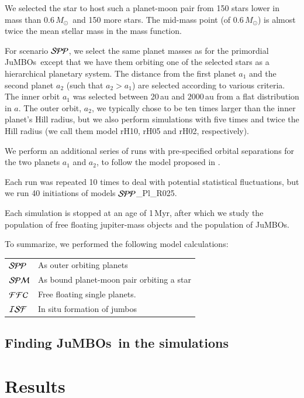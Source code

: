 \documentclass[aa]{lib/aa}
\newcommand{\MSun}{\mbox{${M}_\odot$}}
\newcommand{\jumbos}{\mbox{JuMBOs}}
\begin{document}
We selected the star to host such a planet-moon pair from 150 stars
lower in mass than 0.6\,\MSun\, and 150 more stars. The mid-mass point
(of 0.6\,\MSun) is almost twice the mean stellar mass in the mass
function.

For scenario ${\cal SPP}$, we select the same planet masses as for the
primordial \jumbos\, except that we have them orbiting one of the
selected stars as a hierarchical planetary system. The distance from
the first planet $a_1$ and the second planet $a_2$ (such that
$a_2>a_1$) are selected according to various criteria.  The inner
orbit $a_1$ was selected between 20\,au and $2000$\,au from a flat
distribution in $a$.  The outer orbit, $a_2$, we typically chose to be
ten times larger than the inner planet's Hill radius, but we also
perform simulations with five times and twice the Hill radius (we call
them model rH10, rH05 and rH02, respectively).

We perform an additional series of runs with pre-specified orbital
separations for the two planets $a_1$ and $a_2$, to follow the model
proposed in \cite{2023arXiv231006016W}.

Each run was repeated 10 times to deal with potential statistical
fluctuations, but we run 40 initiations of models ${\cal SPP}$\_Pl\_R025.

Each simulation is stopped at an age of 1\,Myr, after which we study
the population of free floating jupiter-mass objects and the
population of \jumbos.

To summarize, we performed the following model calculations:\\
\begin{tabular}{ll}
${\cal SPP}$ & As outer orbiting planets\\
${\cal SPM}$ & As bound planet-moon pair orbiting a star\\
${\cal FFC}$ & Free floating single planets.\\
${\cal ISF}$ & In situ formation of jumbos\\
\end{tabular}

\subsection{Finding \jumbos\, in the simulations}


\section{Results}
\end{document}
